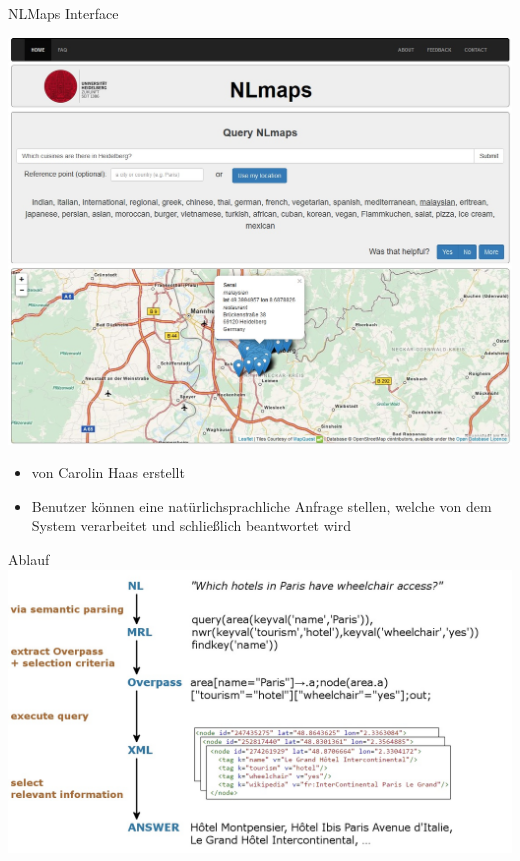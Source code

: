 \documentclass[note=hide]{beamer} %
\begin{document}
\begin{frame}{NLMaps Interface}
	\begin{minipage}{0.64\textwidth}
		\flushleft
		\includegraphics[width=\textwidth]{interface.jpg}
	\end{minipage}
	\hfill
	\begin{minipage}{0.34\textwidth}
		\flushright
	\begin{itemize}
		\item von Carolin Haas erstellt
		\item Benutzer können eine natürlichsprachliche Anfrage stellen, welche von dem System verarbeitet und schließlich beantwortet wird
	\end{itemize}
\end{minipage}
\end{frame}

\begin{frame}{Ablauf}
	\includegraphics[width=\textwidth]{pipeline.jpg}
\end{frame}
\end{document}
